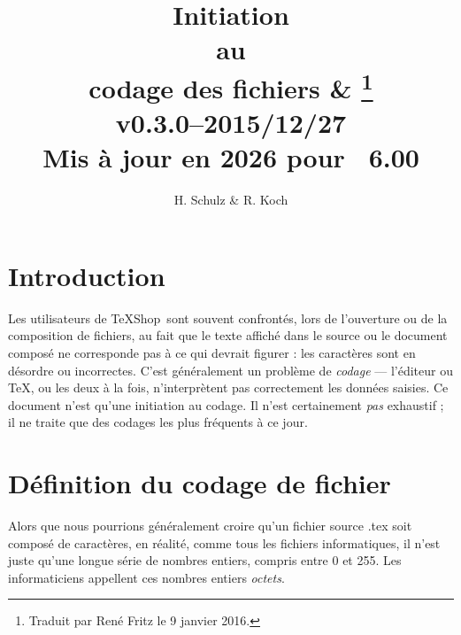 \documentclass[11pt,french]{article}
\title{Initiation\\ au\\ codage des fichiers \& \TS\thanks{Traduit par René Fritz le 9 janvier 2016.}\\\small v0.3.0--2015/12/27\\Mis à jour en 2026 pour \TS\ 6.00}
\author{H. Schulz \& R. Koch}
\date{}
\newcommand{\TS}{\textsf{\TeX Shop}}
\newcommand{\cmd}[1]{\textsf{#1}}
\begin{document}
\maketitle
\thispagestyle{empty}

\section{Introduction}
Les utilisateurs de \TS\ sont souvent confrontés, lors de l'ouverture ou de la composition de fichiers, au fait que le texte affiché dans le source ou le document composé ne corresponde pas à ce qui devrait figurer : les caractères sont en désordre ou incorrectes. C'est généralement un problème de \emph{codage} --- l'éditeur ou \TeX, ou les deux à la fois, n'interprètent pas correctement les données saisies. Ce document n'est qu'une initiation au codage. Il n'est certainement \emph{pas} exhaustif ; il ne traite que des codages les plus fréquents à ce jour.

\section{Définition du codage de fichier}

Alors que nous pourrions généralement croire qu'un fichier source \cmd{.tex} soit composé de caractères, en réalité, comme tous les fichiers informatiques, il n'est juste qu'une longue série de nombres entiers, compris entre 0 et 255. Les informaticiens appellent ces nombres entiers {\em octets}.
\end{document}
